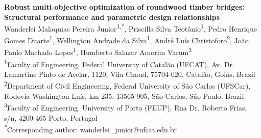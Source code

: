 \begin{center}
	{\Large\bfseries Robust multi-objective optimization of roundwood timber bridges: Structural performance and parametric design relationships}
	\\[2ex]

	{\small
		Wanderlei Malaquias Pereira Junior\textsuperscript{1,*},
		Priscilla Silva Teotônio\textsuperscript{1},
		Pedro Henrique Gomes Duarte\textsuperscript{1}\orcidlink{},
		Wellington Andrade da Silva\textsuperscript{1},
		André Luís Christoforo\textsuperscript{2},
		João Paulo Machado Lopes\textsuperscript{1},
		Humberto Salazar Amorim Varum\textsuperscript{3}
	}
	\\[1ex]

	{\footnotesize
		\textsuperscript{1}Faculty of Engineering, Federal University of Catalão (UFCAT), Av. Dr. Lamartine Pinto de Avelar, 1120, Vila Chaud, 75704-020, Catalão, Goiás, Brazil \\[0.3ex]
		\textsuperscript{2}Department of Civil Engineering, Federal University of São Carlos (UFSCar), Rodovia Washington Luís, km 235, 13565-905, São Carlos, São Paulo, Brazil \\[0.3ex]
		\textsuperscript{3}Faculty of Engineering, University of Porto (FEUP), Rua Dr. Roberto Frias, s/n, 4200-465 Porto, Portugal
	}
	\\[0.8ex]

	{\footnotesize \textsuperscript{*}Corresponding author: wanderlei\_junior@ufcat.edu.br}

\end{center}
